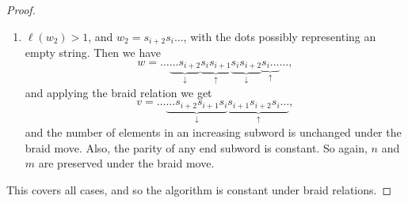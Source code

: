 \documentclass[10pt,a4paper]{amsart}
\begin{document}
\begin{proof}
\begin{enumerate}[(i)]
\begin{enumerate}
        \item $\ell(w_2)>1$, and $w_2=s_{i+2}s_i\hdots$, with the dots possibly representing an empty string. Then we have 
        \[w=\hdots\underbrace{\hdots s_{i+2}}_\downarrow\underbrace{s_is_{i+1}}_\uparrow\underbrace{s_is_{i+2}}_\downarrow\underbrace{s_i\hdots}_\uparrow\hdots,\]
        and applying the braid relation we get
        \[v=\hdots\underbrace{\hdots s_{i+2}s_{i+1}s_i}_\downarrow\underbrace{s_{i+1}s_{i+2}s_i\hdots}_\uparrow,\]
        and the number of elements in an increasing subword is unchanged under the braid move. Also, the parity of any end subword is constant. So again, $n$ and $m$ are preserved under the braid move. 








        
        \end{enumerate}
    \end{enumerate}
    This covers all cases, and so the algorithm is constant under braid relations. 
\end{proof}
\end{document}
